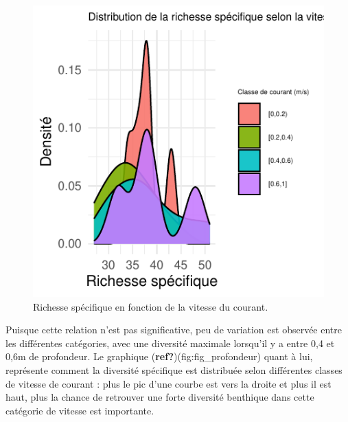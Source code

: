 \documentclass[9pt,twocolumn,twoside,]{pnas-new}
\begin{document}
\begin{figure}[H]

{\centering \includegraphics{RMarkdown-article_files/figure-latex/fig_courant-1} 

}

\caption{Richesse spécifique en fonction de la vitesse du courant.}\label{fig:fig_courant}
\end{figure}

Puisque cette relation n'est pas significative, peu de variation est
observée entre les différentes catégories, avec une diversité maximale
lorsqu'il y a entre 0,4 et 0,6m de profondeur. Le graphique
(\textbf{ref?})(fig:fig\_profondeur) quant à lui, représente comment la
diversité spécifique est distribuée selon différentes classes de vitesse
de courant : plus le pic d'une courbe est vers la droite et plus il est
haut, plus la chance de retrouver une forte diversité benthique dans
cette catégorie de vitesse est importante.
\end{document}
